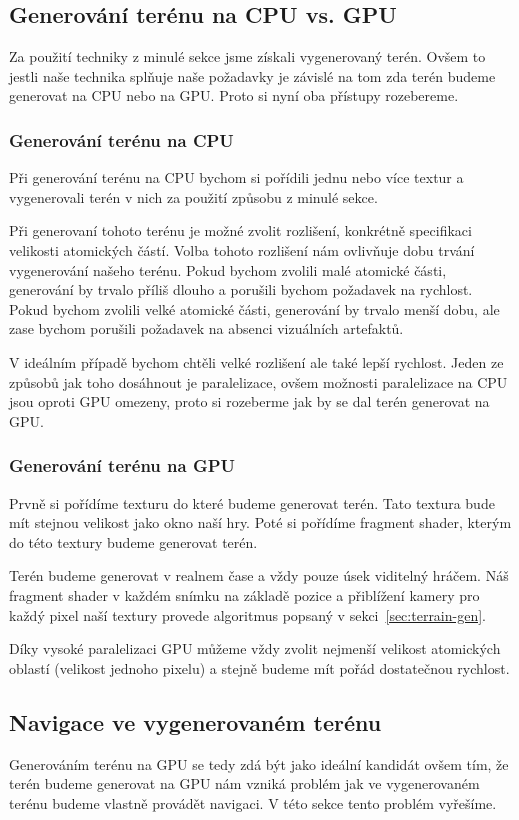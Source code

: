 \subsection{Generování terénu na CPU vs. GPU}
Za použití techniky z minulé sekce jsme získali vygenerovaný terén. Ovšem to jestli naše technika splňuje naše požadavky je závislé na tom zda terén budeme generovat na CPU nebo na GPU. Proto si nyní oba přístupy rozebereme.

\subsubsection{Generování terénu na CPU}
Při generování terénu na CPU bychom si pořídili jednu nebo více textur a vygenerovali terén v nich za použití způsobu z minulé sekce.

Při generovaní tohoto terénu je možné zvolit rozlišení, konkrétně specifikaci velikosti atomických částí. Volba tohoto rozlišení nám ovlivňuje dobu trvání vygenerování našeho terénu. Pokud bychom zvolili malé atomické části, generování by trvalo příliš dlouho a porušili bychom požadavek na rychlost. Pokud bychom zvolili velké atomické části, generování by trvalo menší dobu, ale zase bychom porušili požadavek na absenci vizuálních artefaktů.

V ideálním případě bychom chtěli velké rozlišení ale také lepší rychlost. Jeden ze způsobů jak toho dosáhnout je paralelizace, ovšem možnosti paralelizace na CPU jsou oproti GPU omezeny, proto si rozeberme jak by se dal terén generovat na GPU.

\subsubsection{Generování terénu na GPU}
Prvně si pořídíme texturu do které budeme generovat terén. Tato textura bude mít stejnou velikost jako okno naší hry. Poté si pořídíme fragment shader, kterým do této textury budeme generovat terén.

Terén budeme generovat v realnem čase a vždy pouze úsek viditelný hráčem. Náš fragment shader v každém snímku na základě pozice a přiblížení kamery pro každý pixel naší textury provede algoritmus popsaný v sekci~\ref{sec:terrain-gen}.

Díky vysoké paralelizaci GPU můžeme vždy zvolit nejmenší velikost atomických oblastí (velikost jednoho pixelu) a stejně budeme mít pořád dostatečnou rychlost.

\subsection{Navigace ve vygenerovaném terénu}
Generováním terénu na GPU se tedy zdá být jako ideální kandidát ovšem tím, že terén budeme generovat na GPU nám vzniká problém jak ve vygenerovaném terénu budeme vlastně provádět navigaci. V této sekce tento problém vyřešíme.

